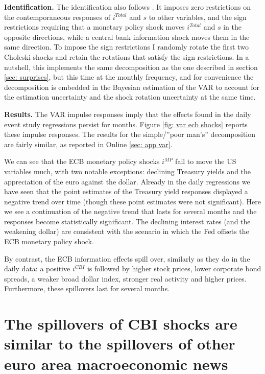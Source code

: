 \documentclass[a4paper,12pt]{article}
\begin{document}
\textbf{Identification.} The identification also follows \cite{Jarocinski_Karadi_2020}. It imposes zero restrictions on the contemporaneous responses of $i^{Total}$ and $s$ to other variables, and the sign restrictions requiring that a monetary policy shock moves $i^{Total}$ and $s$ in the opposite directions, while a central bank information shock moves them in the same direction. To impose the sign restrictions I randomly rotate the first two Choleski shocks and retain the rotations that satisfy the sign restrictions. In a nutshell, this implements the same decomposition as the one described
in section \ref{sec: surprises}, but this time at the monthly frequency, and for convenience the decomposition
is embedded in the Bayesian estimation of the VAR to account for the estimation uncertainty and the shock rotation uncertainty at the same time.

\textbf{Results.} The VAR impulse responses imply that the effects found in the daily event study regressions persist for months. 
Figure \ref{fig: var ecb shocks} reports these impulse responses. The results for the simple/''poor man's'' decomposition are fairly similar, as reported in Online \ref{sec: app var}.

We can see that the ECB monetary policy shocks $i^{MP}$ fail to move the US variables much,
with two notable exceptions: declining Treasury yields
and the appreciation of the euro against the dollar. 
Already in the daily regressions we have seen that the point estimates of the Treasury yield responses
displayed a negative trend over time (though these point estimates were not significant).
Here we see a continuation of the negative trend that lasts for several months and the responses
become statistically significant.
The declining interest rates (and the weakening dollar) are consistent with the scenario in which
the Fed offsets the ECB monetary policy shock.

By contrast, the ECB information effects spill over, similarly as they do in the daily data:
a positive $i^{CBI}$ is followed by higher stock prices, lower corporate bond spreads, a weaker broad dollar index, stronger real activity and higher prices.
Furthermore, these spillovers last for several months.

\section{The spillovers of CBI shocks are similar to the spillovers of other euro area macroeconomic news}
\end{document}

